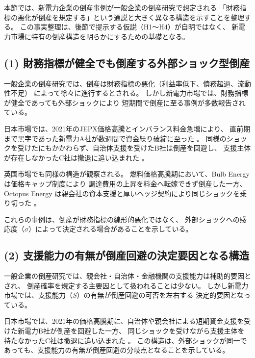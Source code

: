 本節では、新電力企業の倒産事例が一般企業の倒産研究で想定される
「財務指標の悪化が倒産を規定する」という通説と大きく異なる構造を示すことを整理する。
この事実整理は、後節で提示する仮説（H1〜H4）が自明ではなく、
新電力市場に特有の倒産構造を明らかにするための基礎となる。

\subsection*{(1) 財務指標が健全でも倒産する外部ショック型倒産}

一般企業の倒産研究では、倒産は財務指標の悪化（利益率低下、債務超過、流動性不足）
によって徐々に進行するとされる。
しかし新電力市場では、財務指標が健全であっても外部ショックにより
短期間で倒産に至る事例が多数報告されている。

日本市場では、2021年のJEPX価格高騰とインバランス料金急増により、
直前期まで黒字であった新電力A社が数週間で資金繰り破綻に至った
\parencite{TDB2021PowerCrisis,TSR2021PowerCrisis}。
同様のショックを受けたにもかかわらず、自治体支援を受けたB社は倒産を回避し、
支援主体が存在しなかったC社は撤退に追い込まれた
\parencite{DenkiShimbun2021Crisis,CityCouncil2021Support}。

英国市場でも同様の構造が観察される。
燃料価格高騰期において、Bulb Energy は価格キャップ制度により
調達費用の上昇を料金へ転嫁できず倒産した一方、
Octopus Energy は親会社の資本支援と厚いヘッジ契約により同じショックを乗り切った
\parencite{Ofgem2021BulbSLR,Ofgem2021OctopusTakeover,UKGov2021BulbSupport}。

これらの事例は、倒産が財務指標の線形的悪化ではなく、
外部ショックへの感応度（$\sigma$）によって決定される場合があることを示している。

\subsection*{(2) 支援能力の有無が倒産回避の決定要因となる構造}

一般企業の倒産研究では、親会社・自治体・金融機関の支援能力は補助的要因とされ、
倒産確率を規定する主要因として扱われることは少ない。
しかし新電力市場では、支援能力（$S$）の有無が倒産回避の可否を左右する
決定的要因となっている。

日本市場では、2021年の価格高騰期に、自治体や親会社による短期資金支援を受けた新電力B社が倒産を回避した一方、
同じショックを受けながら支援主体を持たなかったC社は撤退に追い込まれた
\parencite{DenkiShimbun2021Crisis,CityCouncil2021Support}。
この構造は、外部ショックが同一であっても、支援能力の有無が倒産回避の分岐点となることを示している。

